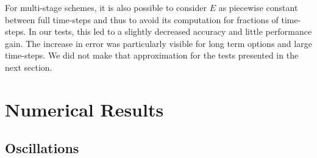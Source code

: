 \documentclass[]{rAMF2e}
\begin{document}
For multi-stage schemes, it is also possible to consider $E$ as piecewise constant between full time-steps and thus to avoid its computation for fractions of time-steps. In our tests, this led to a slightly decreased accuracy and little performance gain. The increase in error was particularly visible for long term options and large time-steps. We did not make that approximation for the tests presented in the next section.

\section{Numerical Results}
\subsection{Oscillations}
\begin{figure}[htb]
  \begin{center}  

\end{center}
\end{figure}
\end{document}
